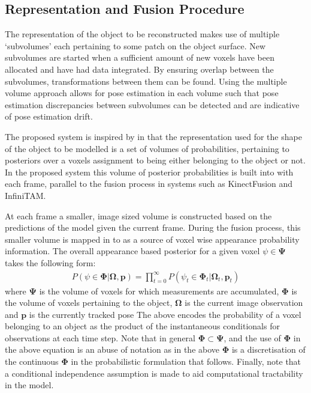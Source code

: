 \subsection{Representation and Fusion Procedure}
The representation of the object to be reconstructed makes use of multiple `subvolumes' each pertaining to some patch on the object surface. 
New subvolumes are started when a sufficient amount of new voxels have been allocated and have had data integrated. By ensuring overlap 
between the subvolumes, transformations between them can be found. Using the multiple volume approach allows for pose estimation in each 
volume such that pose estimation discrepancies between subvolumes can be detected and are indicative of pose estimation drift.

The proposed system is inspired by\cite{Kolev2006} in that the representation used for the shape of the object to be modelled is a set of volumes 
of probabilities, pertaining to posteriors over a voxels assignment to being either belonging to the object or not. In the proposed system this 
volume of posterior probabilities is built into with each frame, parallel to the fusion process in systems such as KinectFusion\cite{Newcombe2011} 
and InfiniTAM\cite{Prisacariu2014}.

At each frame a smaller, image sized volume is constructed based on the predictions of the model given the current frame. During the fusion process, this 
smaller volume is mapped in to as a source of voxel wise appearance probability information. The overall appearance based posterior for a given voxel 
$\psi \in \mathbf{\Psi}$ takes the following form:
\begin{equation}
\begin{split}
P(\psi \in \mathbf{\Phi} | \mathbf{\Omega}, \mathbf{p}) = \prod_{t=0}^{\infty} P(\psi_{t} \in \mathbf{\Phi}_{t} | \mathbf{\Omega}_{t}, \mathbf{p}_{t})
\end{split}
\end{equation}
where $\mathbf{\Psi}$ is the volume of voxels for which measurements are accumulated, $\mathbf{\Phi}$ 
is the volume of voxels pertaining to the object, $\mathbf{\Omega}$ is the current image observation and $\mathbf{p}$ is the currently tracked pose
The above encodes the probability of a voxel belonging to an object as the product of the instantaneous conditionals for observations at each time step. 
Note that in general $\mathbf{\Phi} \subset \mathbf{\Psi}$, and the use of $\mathbf{\Phi}$ in the above equation is an abuse of notation as in the above 
$\mathbf{\Phi}$ is a discretisation of the continuous $\mathbf{\Phi}$ in the probabilistic formulation that follows. Finally, note that a conditional 
independence assumption is made to aid computational tractability in the model.

